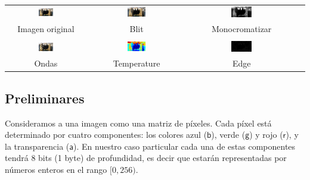 \documentclass[a4paper, 12pt]{article}
\newcommand{\Alpha}{\ensuremath{\mathsf{a}}\xspace}
\newcommand{\Red  }{\ensuremath{\mathsf{r}}\xspace}
\newcommand{\Green}{\ensuremath{\mathsf{g}}\xspace}
\newcommand{\Blue }{\ensuremath{\mathsf{b}}\xspace}
\begin{document}
\begin{center}
 \begin{tabular}{cccc}
   \includegraphics[width=0.2\textwidth]{imagenes/island.png} &
   \includegraphics[width=0.2\textwidth]{imagenes/island-blit.png} &
   \includegraphics[width=0.2\textwidth]{imagenes/island-monocromatizar.png} \\
   Imagen original & Blit & Monocromatizar \\
   \\
   \includegraphics[width=0.2\textwidth]{imagenes/island-ondas.png} &
   \includegraphics[width=0.2\textwidth]{imagenes/island-temperature.png} &
   \includegraphics[width=0.2\textwidth]{imagenes/island-edge.png} \\
   Ondas & Temperature & Edge \\
 \end{tabular}
\end{center}

\subsection{Preliminares}

Consideramos a una imagen como una matriz de píxeles. Cada píxel está determinado por cuatro componentes: los colores azul (\Blue), verde (\Green) y rojo (\Red), y la transparencia (\Alpha). En nuestro caso particular cada una de estas componentes tendrá 8 bits (1 byte) de profundidad, es decir que estarán representadas por números enteros en el rango $[0,256)$.
\end{document}
